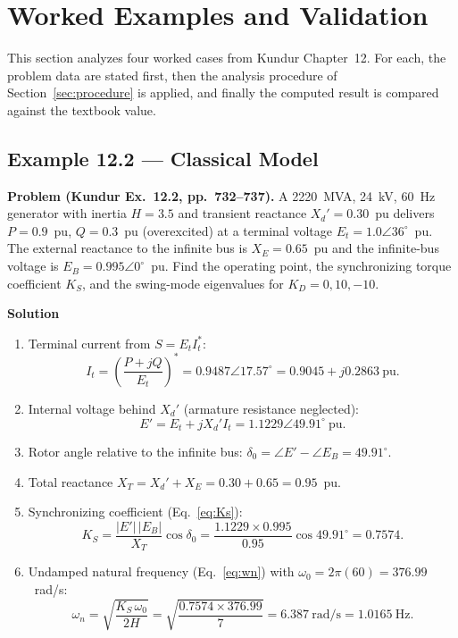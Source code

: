 \documentclass[12pt,a4paper]{article}
\begin{document}
\section{Worked Examples and Validation}

This section analyzes four worked cases from Kundur Chapter~12. For each, the
problem data are stated first, then the analysis procedure of
Section~\ref{sec:procedure} is applied, and finally the computed result is
compared against the textbook value.

\subsection{Example 12.2 --- Classical Model}

\textbf{Problem (Kundur Ex.\ 12.2, pp.\ 732--737).} A 2220~MVA, 24~kV, 60~Hz
generator with inertia $H=3.5$ and transient reactance $X_d'=0.30$~pu delivers
$P=0.9$~pu, $Q=0.3$~pu (overexcited) at a terminal voltage
$E_t = 1.0\angle 36^\circ$~pu. The external reactance to the infinite bus is
$X_E = 0.65$~pu and the infinite-bus voltage is $E_B = 0.995\angle 0^\circ$~pu.
Find the operating point, the synchronizing torque coefficient $K_S$, and the
swing-mode eigenvalues for $K_D = 0, 10, -10$.

\textbf{Solution}
\begin{enumerate}
\item Terminal current from $S = E_t I_t^{*}$:
      \[ I_t = \left(\frac{P+jQ}{E_t}\right)^{\!*} = 0.9487\angle 17.57^\circ
         = 0.9045 + j0.2863 \ \text{pu}. \]
\item Internal voltage behind $X_d'$ (armature resistance neglected):
      \[ E' = E_t + jX_d' I_t = 1.1229\angle 49.91^\circ \ \text{pu}. \]
\item Rotor angle relative to the infinite bus:
      $\delta_0 = \angle E' - \angle E_B = 49.91^\circ$.
\item Total reactance $X_T = X_d' + X_E = 0.30 + 0.65 = 0.95$~pu.
\item Synchronizing coefficient (Eq.~\ref{eq:Ks}):
      \[ K_S = \frac{|E'|\,|E_B|}{X_T}\cos\delta_0
             = \frac{1.1229 \times 0.995}{0.95}\cos 49.91^\circ = 0.7574. \]
\item Undamped natural frequency (Eq.~\ref{eq:wn}) with
      $\omega_0 = 2\pi(60) = 376.99$~rad/s:
      \[ \omega_n = \sqrt{\frac{K_S\,\omega_0}{2H}}
         = \sqrt{\frac{0.7574 \times 376.99}{7}} = 6.387\ \text{rad/s}
         = 1.0165\ \text{Hz}. \]
\end{enumerate}
\end{document}
